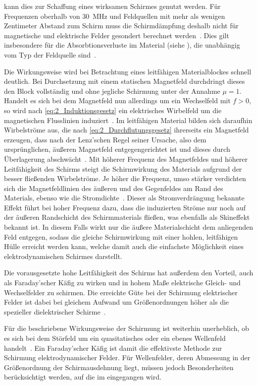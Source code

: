 kann dies zur Schaffung eines wirksamen Schirmes genutzt werden. Für Frequenzen oberhalb von \SI{30}{\mega\hertz} und Feldquellen mit mehr als wenigen Zentimeter Abstand zum Schirm muss die Schirmdämpfung deshalb nicht für magnetische und elektrische Felder gesondert berechnet werden~\cite{Design_of_shielded_enclosures}. Dies gilt insbesondere für die Absorbtionsverluste im Material (siehe \Abschnitt{}), die unabhängig vom Typ der Feldquelle sind~\cite{NASA_SP-3067}.   
\par 
\vspace{\linespace}
Die Wirkungsweise wird bei Betrachtung eines leitfähigen Materialblockes schnell deutlich. Bei Durchsetzung mit einem statischen Magnetfeld durchdringt dieses den Block vollständig und ohne jegliche Schirmung unter der Annahme $\mu = 1$. Handelt es sich bei dem Magnetfeld nun allerdings um ein Wechselfeld mit $f > 0$, so wird nach \Gleichung\eqref{eq:2_Induktionsgesetz} ein elektrisches Wirbelfeld um die magnetischen Flusslinien induziert~\cite{EM_Schirmung}. Im leitfähigen Material bilden sich daraufhin Wirbelströme aus, die nach \Gleichung\eqref{eq:2_Durchflutungsgesetz} ihrerseits ein Magnetfeld erzeugen, dass nach der Lenz'schen Regel seiner Ursache, also dem ursprünglichen, äußeren Magnetfeld entgegengerichtet ist und dieses durch Überlagerung abschwächt~\cite{EM_Schirmung}. Mit höherer Frequenz des Magnetfeldes und höherer Leitfähigkeit des Schirms steigt die Schirmwirkung des Materials aufgrund der besser fließenden Wirbelströme. Je höher die Frequenz, umso stärker verdichten sich die Magnetfeldlinien des äußeren und des Gegenfeldes am Rand des Materials, ebenso wie die Stromdichte~\cite{EM_Schirmung}. Dieser als Stromverdrängung bekannte Effekt führt bei hoher Frequenz dazu, dass die induzierten Ströme nur noch auf der äußeren Randschicht des Schirmmaterials fließen, was ebenfalls als Skineffekt bekannt ist. In diesem Falls wirkt nur die äußere Materialschicht dem anliegenden Feld entgegen, sodass die gleiche Schirmwirkung mit einer hohlen, leitfähigen Hülle erreicht werden kann, welche damit auch die einfachste Möglichkeit eines elektrodynamischen Schirmes darstellt. 
\par 
\vspace{\linespace}
Die vorausgesetzte hohe Leitfähigkeit des Schirms hat außerdem den Vorteil, auch als Faraday'scher Käfig zu wirken und in hohem Maße elektrische Gleich- und Wechselfelder zu schirmen. Die erreichte Güte bei der Schirmung elektrischer Felder ist dabei bei gleichem Aufwand um Größenordnungen höher als die spezieller dielektrischer Schirme~\cite{EM_Schirmung}.
\par
\vspace{\linespace}
Für die beschriebene Wirkungsweise der Schirmung ist weiterhin unerheblich, ob es sich bei dem Störfeld um ein quasitatisches oder ein ebenes Wellenfeld handelt~\cite{EM_Schirmung}. Ein Faraday'scher Käfig ist damit die effektivste Methode zur Schirmung elektrodynamischer Felder. Für Wellenfelder, deren Abmessung in der Größenordnung der Schirmausdehnung liegt, müssen jedoch Besonderheiten berücksichtigt werden, auf die im \Abschnitt{} eingegangen wird.  


